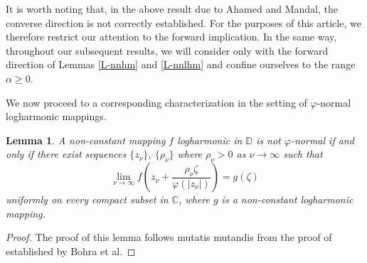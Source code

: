 \documentclass[11pt, reqno]{amsart}
\newtheorem{lemma}[theorem]{Lemma}
\theoremstyle{definition}
\theoremstyle{remark}
\numberwithin{equation}{section}
\begin{document}
It is worth noting that, in the above result due to Ahamed and Mandal, the converse direction is not 
correctly established. For the purposes of this article, we therefore restrict our attention to the 
forward implication. In the same way, throughout our subsequent results, we will consider only with the forward direction of Lemmas \ref{L-nnhm} and 
\ref{L-nnlhm} and confine ourselves to the range $\alpha\geq 0$.\smallskip

We now proceed to a corresponding characterization in the setting of $\varphi$-normal logharmonic mappings.
\begin{lemma} \label{L-phinnlhm} 
A non-constant mapping $f$ logharmonic in $\mathbb D$ is not $\varphi$-normal if and only if there exist
sequences $\{z_{\nu}\}$, $\{\rho_{\nu} \}$ where $\rho_{\nu} >0 $ as $\nu\to\infty$ such that 
\begin{equation*}\lim_{\nu\to\infty} f\left(z_{\nu}+\frac{\rho_{\nu} \zeta}{\varphi(|z_{\nu}|)}\right)=g(\zeta)\end{equation*}
uniformly on every compact subset in $\mathbb C$, where $g$ is a non-constant logharmonic mapping.
\end{lemma}
\begin{proof} The proof of this lemma follows mutatis mutandis from the proof of \cite[Theorem 1.3]{bohra-lfptfpnhm-2025} established by Bohra et al.\end{proof}
\end{document}
